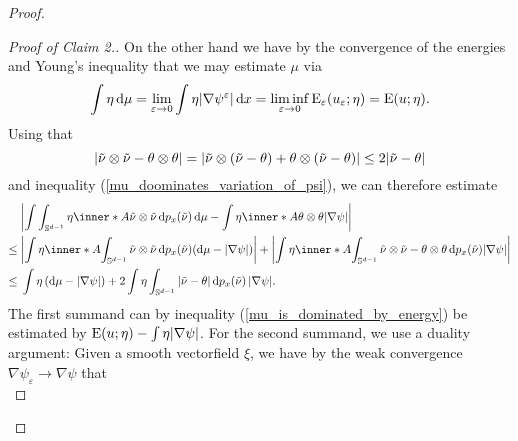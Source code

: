\begin{proof}
\begin{proof}[Proof of Claim 2.]
		On the other hand we have by the convergence of the energies and 
		Young's inequality that we 
		may estimate $ \mu $ via 
		\begin{equation}
			\label{mu_is_dominated_by_energy}
			\int
				\eta
			\dd{ \mu }
			=
			\lim_{ \varepsilon \to 0 }
				\int
					\eta
					\abs{ \nabla \psi^{ \varepsilon } }
				\dd{ x }
			=
			\liminf_{ \varepsilon \to 0 }
				\operatorname{E}_{ \varepsilon } ( u_{ \varepsilon } ; \eta )
			=
			\operatorname{E} ( u ; \eta ).
		\end{equation}
		Using that
		\begin{equation*} 
			\abs{ \tilde{ \nu } \otimes \tilde{ \nu } - \theta \otimes \theta } 
			= 
			\abs{ 
				\tilde{ \nu } \otimes ( \tilde{ \nu } - \theta ) 
				+
				\theta \otimes ( \tilde{ \nu } - \theta ) 
			}
			\leq
			2 \abs{ \tilde{ \nu } - \theta }
		\end{equation*}
		and inequality (\ref{mu_doominates_variation_of_psi}), we can therefore 
		estimate
		\begin{align*}
			&
			\abs{ 
				\int
					\int_{ \mathbb{ S }^{ d - 1 } }
						\eta
						\inner*{ A }{ \tilde{ \nu } \otimes \tilde{ \nu } }
					\dd{ p_{ x } ( \tilde{ \nu } ) }
				\dd{ \mu }
				-
				\int
					\eta
					\inner*{ A }{ \theta \otimes \theta }
				\abs{ \nabla \psi }
			}
			\\
			\leq{} &
			\abs{ 
				\int
					\eta 
					\inner*{ A }
					{ 
						\int_{ \mathbb{ S }^{ d - 1 } }
							\tilde{ \nu } \otimes \tilde{ \nu }
						\dd{ p_{ x } ( \tilde{ \nu } ) }
					}
				( \dd{ \mu } - \abs{ \nabla \psi } )
			}
			+
			\abs{
				\int
					\eta
					\inner*{ A }{
						\int_{ \mathbb{ S }^{ d - 1 } }
							\tilde{ \nu } \otimes \tilde{ \nu }
							-
							\theta \otimes \theta
						\dd{ p_{ x } ( \tilde{ \nu } ) }
					}
				\abs{ \nabla \psi }
			}
			\\
			\leq {} &
			\int
				\eta
			\left( \dd{ \mu } - \abs{ \nabla \psi } \right)
			+
			2
			\int
				\eta
				\int_{ \mathbb{ S }^{ d - 1 } }
					\abs{ \tilde{ \nu } - \theta } 
				\dd{ p_{ x } ( \tilde{ \nu } ) }
			\abs{ \nabla \psi }.
		\end{align*}
		The first summand can by inequality (\ref{mu_is_dominated_by_energy}) 
		be estimated by 
		$ \operatorname{E} ( u ; \eta ) - \int \eta \abs{ \nabla \psi } $.
		For the second summand, we use a duality argument:
		Given a smooth vectorfield $ \xi $, we have by the weak convergence $ 
		\nabla \psi_{ \varepsilon } \to \nabla \psi $ that
		\begin{equation*}

\end{equation*}
\end{proof}
\end{proof}
